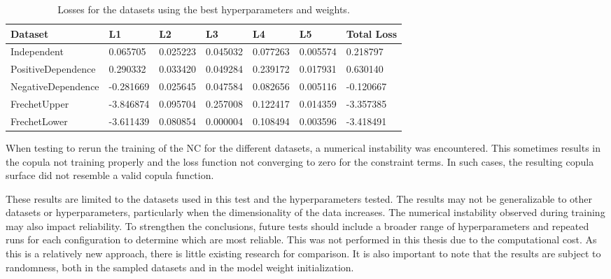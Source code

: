 \begin{table}[h!]
    \centering
    \caption{Losses for the datasets using the best hyperparameters and weights.}
    \begin{tabular}{lllllll}
        \textbf{Dataset} & \textbf{L1} & \textbf{L2} & \textbf{L3} & \textbf{L4} & \textbf{L5} & \textbf{Total Loss} \\
        \midrule
        Independent & 0.065705 & 0.025223 & 0.045032 & 0.077263 & 0.005574 & 0.218797 \\
        PositiveDependence & 0.290332 & 0.033420 & 0.049284 & 0.239172 & 0.017931 & 0.630140 \\
        NegativeDependence & -0.281669 & 0.025645 & 0.047584 & 0.082656 & 0.005116 & -0.120667 \\
        FrechetUpper & -3.846874 & 0.095704 & 0.257008 & 0.122417 & 0.014359 & -3.357385 \\
        FrechetLower & -3.611439 & 0.080854 & 0.000004 & 0.108494 & 0.003596 & -3.418491 \\
    \end{tabular}
    \label{tab:LossesBestParameters}
\end{table}

\begin{remark}
    When testing to rerun the training of the \gls{NC} for the different datasets, a numerical instability was encountered. This sometimes results in the copula not training properly and the loss function not converging to zero for the constraint terms. In such cases, the resulting copula surface did not resemble a valid copula function.
\end{remark}

These results are limited to the datasets used in this test and the hyperparameters tested. The results may not be generalizable to other datasets or hyperparameters, particularly when the dimensionality of the data increases. The numerical instability observed during training may also impact reliability. To strengthen the conclusions, future tests should include a broader range of hyperparameters and repeated runs for each configuration to determine which are most reliable. This was not performed in this thesis due to the computational cost. As this is a relatively new approach, there is little existing research for comparison. It is also important to note that the results are subject to randomness, both in the sampled datasets and in the model weight initialization.


